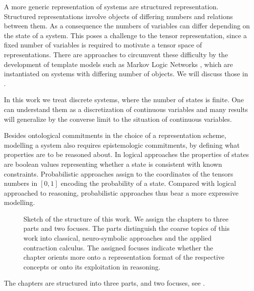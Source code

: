 A more generic representation of systems are structured representation.
Structured representations involve objects of differing numbers and relations between them.
As a consequence the numbers of variables can differ depending on the state of a system.
This poses a challenge to the tensor representation, since a fixed number of variables is required to motivate a tensor space of representations.
There are approaches to circumvent these difficulty by the development of template models such as Markov Logic Networks \cite{richardson_markov_2006}, which are instantiated on systems with differing number of objects.
We will discuss those in .

In this work we treat discrete systems, where the number of states is finite.
One can understand them as a discretization of continuous variables and many results will generalize by the converse limit to the situation of continuous variables.

Besides ontological commitments in the choice of a representation scheme, modelling a system also requires epistemologic commitments, by defining what properties are to be reasoned about.
In logical approaches the properties of states are boolean values representing whether a state is consistent with known constraints.
Probabilistic approaches assign to the coordinates of the tensors numbers in $[0,1]$ encoding the probability of a state.
Compared with logical approached to reasoning, probabilistic approaches thus bear a more expressive modelling.


\begin{figure}[hbt!]
    
    \caption{Sketch of the structure of this work.
        We assign the chapters to three parts and two focuses.
        The parts distinguish the coarse topics of this work into classical, neuro-symbolic approaches and the applied contraction calculus.
        The assigned focuses indicate whether the chapter orients more onto a representation format of the respective concepts or onto its exploitation in reasoning.}
    \label{fig:chapterOverview}
\end{figure}
The chapters are structured into three parts, and two focuses, see .

